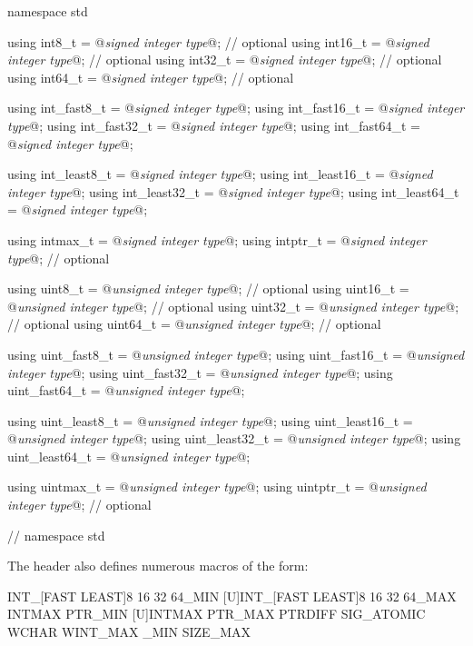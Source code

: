\begin{codeblock}
namespace std {
  using int8_t         = @\textit{signed integer type}@;  // optional
  using int16_t        = @\textit{signed integer type}@;  // optional
  using int32_t        = @\textit{signed integer type}@;  // optional
  using int64_t        = @\textit{signed integer type}@;  // optional

  using int_fast8_t    = @\textit{signed integer type}@;
  using int_fast16_t   = @\textit{signed integer type}@;
  using int_fast32_t   = @\textit{signed integer type}@;
  using int_fast64_t   = @\textit{signed integer type}@;

  using int_least8_t   = @\textit{signed integer type}@;
  using int_least16_t  = @\textit{signed integer type}@;
  using int_least32_t  = @\textit{signed integer type}@;
  using int_least64_t  = @\textit{signed integer type}@;

  using intmax_t       = @\textit{signed integer type}@;
  using intptr_t       = @\textit{signed integer type}@;   // optional

  using uint8_t        = @\textit{unsigned integer type}@; // optional
  using uint16_t       = @\textit{unsigned integer type}@; // optional
  using uint32_t       = @\textit{unsigned integer type}@; // optional
  using uint64_t       = @\textit{unsigned integer type}@; // optional

  using uint_fast8_t   = @\textit{unsigned integer type}@;
  using uint_fast16_t  = @\textit{unsigned integer type}@;
  using uint_fast32_t  = @\textit{unsigned integer type}@;
  using uint_fast64_t  = @\textit{unsigned integer type}@;

  using uint_least8_t  = @\textit{unsigned integer type}@;
  using uint_least16_t = @\textit{unsigned integer type}@;
  using uint_least32_t = @\textit{unsigned integer type}@;
  using uint_least64_t = @\textit{unsigned integer type}@;

  using uintmax_t      = @\textit{unsigned integer type}@;
  using uintptr_t      = @\textit{unsigned integer type}@; // optional
} // namespace std
\end{codeblock}

\pnum
The header also defines numerous macros of the form:

\begin{codeblock}
  INT_[FAST LEAST]{8 16 32 64}_MIN
  [U]INT_[FAST LEAST]{8 16 32 64}_MAX
  INT{MAX PTR}_MIN
  [U]INT{MAX PTR}_MAX
  {PTRDIFF SIG_ATOMIC WCHAR WINT}{_MAX _MIN}
  SIZE_MAX
\end{codeblock}

